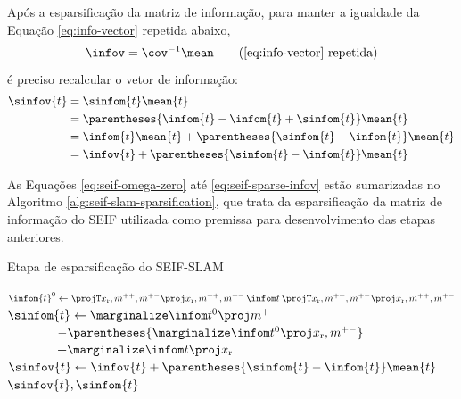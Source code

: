 Após a esparsificação da matriz de informação, para manter a igualdade da Equação \ref{eq:info-vector} repetida abaixo,
\begin{equation*}
  \ifcorrespondence \tag{\ref{eq:info-vector} repetida}
\end{equation*}
é preciso recalcular o vetor de informação:
\begin{equation}
\begin{aligned}
  \sinfov{t} &= \sinfom{t} \mean{t}\\
  &= \parentheses{\infom{t} - \infom{t} + \sinfom{t}} \mean{t}\\
  &= \infom{t}\mean{t} + \parentheses{\sinfom{t} - \infom{t}}\mean{t}\\
  &= \infov{t} + \parentheses{\sinfom{t} - \infom{t}}\mean{t}\\
\end{aligned}
\label{eq:seif-sparse-infov}
\end{equation}

As Equações \ref{eq:seif-omega-zero} até \ref{eq:seif-sparse-infov} 
estão sumarizadas no Algoritmo \ref{alg:seif-slam-sparsification}, que 
trata da esparsificação da matriz de informação do SEIF utilizada 
como premissa para desenvolvimento das etapas anteriores.

\begin{algorithm}[h]
  \caption{Etapa de esparsificação do SEIF-SLAM}
  \label{alg:seif-slam-sparsification}
\begin{algorithmic}[1]
  \State {}
  \State $\infom{t}^0 \gets \OmegaZeroValue$
  \State $\sinfom{t} \gets \OmegaOneValue $\\$\qquad \qquad - \parentheses{\OmegaTwoValue}$\\$\qquad\qquad + \OmegaThreeValue$
  \State $\sinfov{t} \gets \infov{t} + \parentheses{\sinfom{t} - \infom{t}}\mean{t}$
  \State \Return $\sinfov{t}, \sinfom{t}$
  \EndProcedure
\end{algorithmic}
\end{algorithm}

